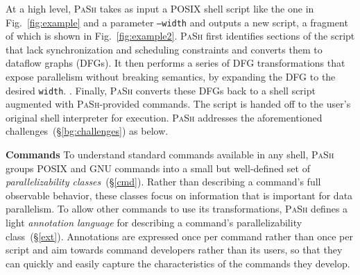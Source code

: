 \documentclass[sigplan, review, screen, anonymous]{acmart}
\newcommand{\heading}[1]{\vspace{4pt}\noindent\textbf{#1}\enspace}
\newcommand{\ttt}[1]{\texttt{#1}}
\newcommand{\kk}[1]{[{\color{magenta}kk: #1}]}
\newcommand{\sx}[1]{(\S\ref{#1})}
\newcommand{\sys}{{\scshape PaSh}\xspace}
\begin{document}
At a high level, \sys takes as input a POSIX shell script like the one in Fig.~\ref{fig:example} and a parameter \ttt{--width} and outputs a new script, a fragment of which is shown in Fig.~\ref{fig:example2}.
% 
\sys first identifies sections of the script that lack synchronization and scheduling constraints and converts them to dataflow graphs (DFGs).
It then performs a series of DFG transformations that expose parallelism without breaking semantics, by expanding the DFG to the desired \ttt{width}.
. %
Finally, \sys converts these DFGs back to a shell script augmented with \sys-provided commands. %
The script is handed off to the user's original shell interpreter for execution.
\sys addresses the aforementioned challenges~\sx{bg:challenges} as below.

\heading{Commands}
To understand standard commands available in any shell, \sys groups POSIX and GNU commands into a small but well-defined set of \emph{parallelizability classes}~\sx{cmd}.
Rather than describing a command's full observable behavior, these classes focus on information that is important for data parallelism.
To allow other commands to use its transformations, \sys defines a light \emph{annotation language} for describing a command's parallelizability class~\sx{ext}.
Annotations are expressed once per command rather than once per script and aim towards command developers rather than its users, so that they can quickly and easily capture the characteristics of the commands they develop.
\end{document}
